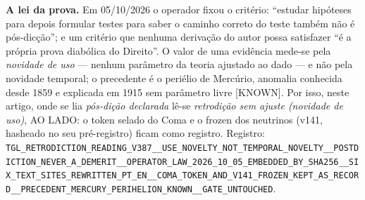 \documentclass[11pt]{article}
\theoremstyle{definition}\newtheorem{deriv}{Derivação}
\begin{document}
\textbf{A lei da prova.} Em 05/10/2026 o operador fixou o critério: ``estudar hipóteses para depois formular testes para saber o caminho correto do teste também não é pós-dicção''; e um critério que nenhuma derivação do autor possa satisfazer ``é a própria prova diabólica do Direito''. O valor de uma evidência mede-se pela \emph{novidade de uso} --- nenhum parâmetro da teoria ajustado ao dado --- e não pela novidade temporal; o precedente é o periélio de Mercúrio, anomalia conhecida desde 1859 e explicada em 1915 sem parâmetro livre \textsf{[KNOWN]}. Por isso, neste artigo, onde se lia \emph{pós-dição declarada} lê-se \emph{retrodição sem ajuste (novidade de uso)}, AO LADO: o token selado do Coma e o frozen dos neutrinos (v141, hasheado no seu pré-registro) ficam como registro. Registro: \texttt{TGL\_\allowbreak{}RETRODICTION\_\allowbreak{}READING\_\allowbreak{}V387\_\allowbreak{}\_\allowbreak{}USE\_\allowbreak{}NOVELTY\_\allowbreak{}NOT\_\allowbreak{}TEMPORAL\_\allowbreak{}NOVELTY\_\allowbreak{}\_\allowbreak{}POSTDICTION\_\allowbreak{}NEVER\_\allowbreak{}A\_\allowbreak{}DEMERIT\_\allowbreak{}\_\allowbreak{}OPERATOR\_\allowbreak{}LAW\_\allowbreak{}2026\_\allowbreak{}10\_\allowbreak{}05\_\allowbreak{}EMBEDDED\_\allowbreak{}BY\_\allowbreak{}SHA256\_\allowbreak{}\_\allowbreak{}SIX\_\allowbreak{}TEXT\_\allowbreak{}SITES\_\allowbreak{}REWRITTEN\_\allowbreak{}PT\_\allowbreak{}EN\_\allowbreak{}\_\allowbreak{}COMA\_\allowbreak{}TOKEN\_\allowbreak{}AND\_\allowbreak{}V141\_\allowbreak{}FROZEN\_\allowbreak{}KEPT\_\allowbreak{}AS\_\allowbreak{}RECORD\_\allowbreak{}\_\allowbreak{}PRECEDENT\_\allowbreak{}MERCURY\_\allowbreak{}PERIHELION\_\allowbreak{}KNOWN\_\allowbreak{}\_\allowbreak{}GATE\_\allowbreak{}UNTOUCHED}.
\end{document}
